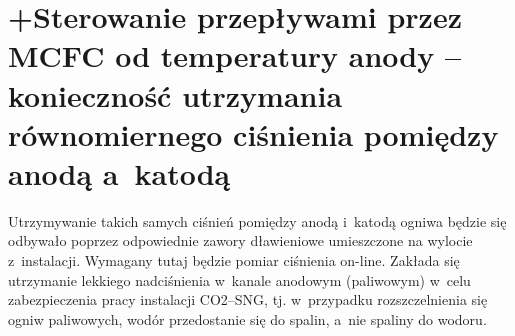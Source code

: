 \section{+Sterowanie przepływami przez MCFC od temperatury anody – konieczność
utrzymania równomiernego ciśnienia pomiędzy anodą a~katodą}

Utrzymywanie takich samych ciśnień pomiędzy anodą i~katodą ogniwa
będzie się odbywało poprzez odpowiednie zawory dławieniowe umieszczone
na wylocie z~instalacji. Wymagany tutaj będzie pomiar ciśnienia
on-line. Zakłada się utrzymanie lekkiego nadciśnienia w~kanale anodowym
(paliwowym) w~celu zabezpieczenia pracy instalacji CO2–SNG, tj. w~przypadku
rozszczelnienia się ogniw paliwowych, wodór przedostanie się do spalin,
a~nie spaliny do wodoru.